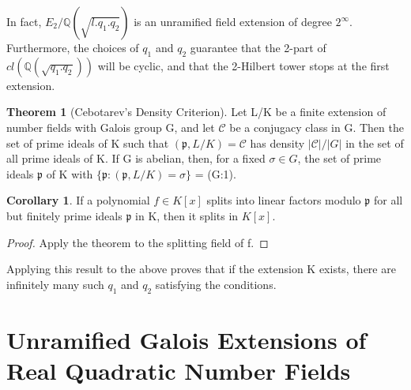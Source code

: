 \documentclass[12pt]{extarticle}
\newcommand{\<}{\langle}
\renewcommand{\>}{\rangle}
\theoremstyle{definition}
\newtheorem{theorem}{Theorem}
\newtheorem{corollary}{Corollary}
\begin{document}
\begin{center}
\end{center}
In fact, $E_2/\mathbb{Q}(\sqrt{l.q_1.q_2})$ is an unramified field extension of degree $2^{\infty}$. Furthermore, the choices of $q_1$ and $q_2$ guarantee that the 2-part of $cl(\mathbb{Q}(\sqrt{q_1.q_2}))$ will be cyclic, and that the 2-Hilbert tower stops at the first extension. 
\begin{theorem}[Cebotarev's Density Criterion]
Let L/K be a finite extension of
number fields with Galois group G, and let $\mathcal{C}$ be a conjugacy class in G. Then the set of
prime ideals of K such that $(\mathfrak{p},L/K)=\mathcal{C}$ has density $|\mathcal{C}|/|G|$ in the set of all prime
ideals of K. If G is abelian, then, for a fixed $\sigma\in G$, the set of prime ideals $\mathfrak{p}$ of K with $\{\mathfrak{p}:(\mathfrak{p},L/K)=\sigma\}$  = (G:1).
\end{theorem}
\begin{corollary}
 If a polynomial $f \in K[x]$ splits into linear factors modulo $\mathfrak{p}$ for all but finitely prime ideals $\mathfrak{p}$ in K, then it splits in $K[x]$.
\end{corollary}
\begin{proof}
Apply the theorem to the splitting field of f.
\end{proof}
Applying this result to the above proves that if the extension K exists, there are infinitely many such $q_1$ and $q_2$ satisfying the conditions.


\section{Unramified Galois Extensions of Real Quadratic Number Fields}
\end{document}
